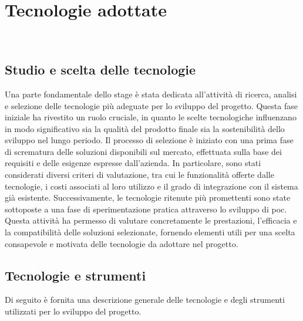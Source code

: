 \chapter{Tecnologie adottate}
\label{cap:tecnologie-adottate}

\\


\section{Studio e scelta delle tecnologie}
\label{sec:studio-tecnologie}
Una parte fondamentale dello stage è stata dedicata all’attività di ricerca, analisi e selezione delle tecnologie più adeguate per lo sviluppo del progetto. Questa fase iniziale ha rivestito un ruolo cruciale, in quanto le scelte tecnologiche influenzano in modo significativo sia la qualità del prodotto finale sia la sostenibilità dello sviluppo nel lungo periodo.
Il processo di selezione è iniziato con una prima fase di scrematura delle soluzioni disponibili sul mercato, effettuata sulla base dei requisiti e delle esigenze espresse dall’azienda. In particolare, sono stati considerati diversi criteri di valutazione, tra cui le funzionalità offerte dalle tecnologie, i costi associati al loro utilizzo e il grado di integrazione con il sistema già esistente.
Successivamente, le tecnologie ritenute più promettenti sono state sottoposte a una fase di sperimentazione pratica attraverso lo sviluppo di \gls{poc}. Questa attività ha permesso di valutare concretamente le prestazioni, l’efficacia e la compatibilità delle soluzioni selezionate, fornendo elementi utili per una scelta consapevole e motivata delle tecnologie da adottare nel progetto.


\section{Tecnologie e strumenti}
\label{sec:tecnologie-strumenti}

Di seguito è fornita una descrizione generale delle tecnologie e degli strumenti utilizzati per lo sviluppo del progetto.

